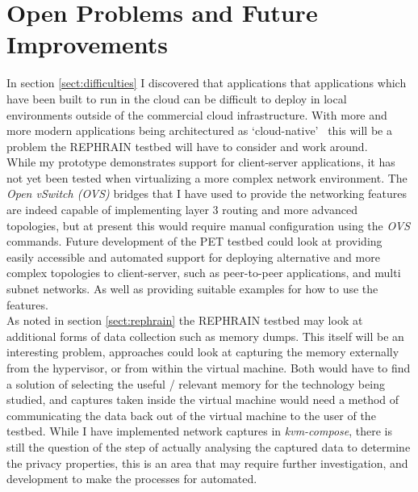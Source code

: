 \documentclass[
    author={Jacob Daniel Halsey},
    supervisor={Prof. Awais Rashid},
    degree={BSc},
    title={Building a Testbed for Evaluating Privacy Enhancing Technologies  (PETs)},
    subtitle={},
    type={software development},
    year={2021}
]{dissertation}
\begin{document}
\section{Open Problems and Future Improvements}

In section \ref{sect:difficulties} I discovered that 
applications that applications which have been built
to run in the cloud can be difficult to deploy in local environments outside of the 
commercial cloud infrastructure. With more and more modern applications being architectured 
as `cloud-native'~\cite{patrizio_2018} this will be a problem the REPHRAIN testbed will have to 
consider and work around. \\

While my prototype demonstrates support for client-server applications, it has not yet been tested
when virtualizing a more complex network environment. 
The \emph{Open vSwitch (OVS)} bridges that I have used to provide the networking features 
are indeed capable of implementing layer 3 routing and more advanced topologies, 
but at present this would require manual configuration using the \emph{OVS} commands.
Future development of the PET testbed could look at providing easily accessible and
automated support 
for deploying alternative and more complex topologies to client-server, such as peer-to-peer 
applications, and multi subnet networks.
As well as providing suitable examples for how to use the features. \\

As noted in section \ref{sect:rephrain} the REPHRAIN testbed may look at additional
forms of data collection such as memory dumps. This itself will be an interesting problem,
approaches could look at capturing the memory externally from the hypervisor, or from within the
virtual machine. Both would have to find a solution of selecting the useful / relevant memory
for the technology being studied, and captures taken inside the virtual machine would need a method
of communicating the data back out of the virtual machine to the user of the testbed.
While I have implemented network captures in \emph{kvm-compose}, there is still the
question of the step of actually analysing the captured data to determine the privacy properties,
this is an area that may require further investigation, and development to make the processes
for automated. \\
\end{document}
